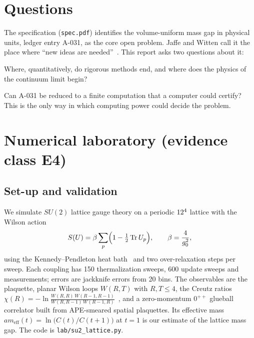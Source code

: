 \documentclass[11pt,a4paper]{article}
\newcommand{\idref}[1]{\textsf{#1}}
\begin{document}
\tableofcontents

\section{Questions}\label{sec:questions}

The specification (\texttt{spec.pdf}) identifies the volume-uniform mass gap in physical units, ledger entry \idref{A-031}, as the core open problem. Jaffe and Witten call it the place where \enquote{new ideas are needed}~\cite[\S6.5]{JW}. This report asks two questions about it:
\begin{description}[font=\normalfont\bfseries,leftmargin=1cm,labelwidth=0.8cm,align=left]
\item[Q1] Where, quantitatively, do rigorous methods end, and where does the physics of the continuum limit begin?
\item[Q2] Can \idref{A-031} be reduced to a finite computation that a computer could certify? This is the only way in which computing power could decide the problem.
\end{description}

\section{Numerical laboratory (evidence class E4)}\label{sec:lab}

\subsection{Set-up and validation}
We simulate $SU(2)$ lattice gauge theory on a periodic $12^4$ lattice with the Wilson action
\[
S(U)=\beta\sum_p\Bigl(1-\tfrac12\operatorname{Tr} U_p\Bigr),\qquad \beta=\frac{4}{g_0^2},
\]
using the Kennedy--Pendleton heat bath~\cite{KP85} and two over-relaxation steps per sweep. Each coupling has 150 thermalization sweeps, 600 update sweeps and \NumMeas{} measurements; errors are jackknife errors from 20 bins. The observables are the plaquette, planar Wilson loops $W(R,T)$ with $R,T\le4$, the Creutz ratios $\chi(R)=-\ln\frac{W(R,R)\,W(R-1,R-1)}{W(R,R-1)\,W(R-1,R)}$~\cite{Cre80}, and a zero-momentum $0^{++}$ glueball correlator built from APE-smeared spatial plaquettes. Its effective mass $am_{\mathrm{eff}}(t)=\ln\bigl(C(t)/C(t+1)\bigr)$ at $t=1$ is our estimate of the lattice mass gap. The code is \texttt{lab/su2\_lattice.py}.
\end{document}
